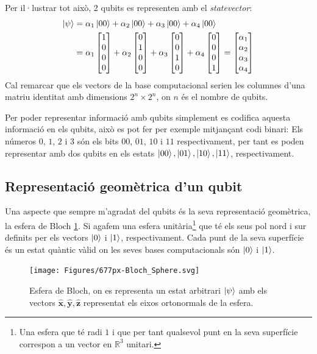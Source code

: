 Per il·lustrar tot això, 2 qubits es representen amb el \textit{statevector}:
\begin{align*}
	\ket{\psi} &= \alpha_1\ket{00} + \alpha_2\ket{00} + \alpha_3\ket{00} + \alpha_4\ket{00}\\
	&= \alpha_1\begin{bmatrix} 1 \\ 0 \\ 0 \\ 0 \end{bmatrix} + \alpha_2 \begin{bmatrix} 0 \\ 1 \\ 0 \\ 0 \end{bmatrix} + \alpha_3 \begin{bmatrix} 0 \\ 0 \\ 1 \\ 0 \end{bmatrix} + \alpha_4\begin{bmatrix} 0 \\ 0 \\ 0 \\ 1 \end{bmatrix} 
	= \begin{bmatrix} \alpha_1 \\ \alpha_2 \\ \alpha_3 \\ \alpha_4 \end{bmatrix}
\end{align*}
Cal remarcar que els vectors de la base computacional serien les columnes d'una matriu identitat amb dimensions $2^n\times 2^n$, on $n$ és el nombre de qubits. 

Per poder representar informació amb qubits simplement es codifica aquesta informació en els qubits, això es pot fer per exemple mitjançant codi binari: Els números $0$, $1$, $2$ i $3$ són els bits $00$, $01$, $10$ i $11$ respectivament, per tant es poden representar amb dos qubits en els estats $\ket{00}, \ket{01}, \ket{10}, \ket{11}$, respectivament.

\subsection{Representació geomètrica d'un qubit}
Una aspecte que sempre m'agradat del qubits és la seva representació geomètrica, la esfera de Bloch \ref{fig:677px-blochsphere}. Si agafem una esfera unitària\footnote{Una esfera que té radi $1$ i que per tant qualsevol punt en la seva superfície correspon a un vector en $\mathbb{R}^3$ unitari. } que té els seus pol nord i sur definits per els vectors $\ket{0}$ i $\ket{1}$, respectivament. Cada punt de la seva superfície és un estat quàntic vàlid on les seves bases computacionals són $\ket{0}$ i $\ket{1}$.
\begin{figure}
	\centering
	\texttt{[image: Figures/677px-Bloch\_Sphere.svg]}
	\caption{Esfera de Bloch, on es representa un estat arbitrari $\ket{\psi}$ amb els vectors $\hat{\mathbf{x}}, \hat{\mathbf{y}}, \hat{\mathbf{z}}$ representat els eixos ortonormals de la esfera.}
	\label{fig:677px-blochsphere}
\end{figure}

